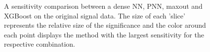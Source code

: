 \begin{figure}
    \caption[A sensitivity comparison between a dense \acs{NN}, \acs{PNN}, maxout and XGBoost on the original 
    signal data.]{A sensitivity comparison between a dense \ac{NN}, \ac{PNN}, maxout and XGBoost on the original 
    signal data. The size of each 'slice' represents the relative size of the significance and the color around each 
    point displays the method with the largest sensitivity for the respective combination.}
    \label{fig:GenPlussXGB}
\end{figure}
